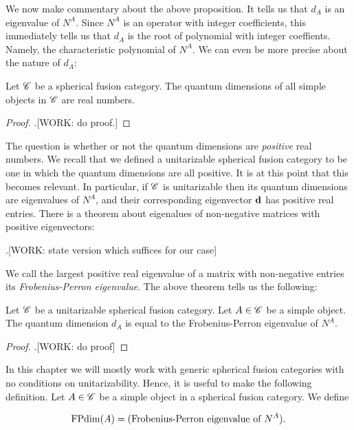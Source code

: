 We now make commentary about the above proposition. It tells us that $d_A$ is an eigenvalue of $N^A$. Since $N^A$ is an operator with integer coefficients, this immediately tells us that $d_A$ is the root of polynomial with integer coeffients. Namely, the characteristic polynomial of $N^A$. We can even be more precise about the nature of $d_A$:

\begin{corollary} Let $\mathscr{C}$ be a spherical fusion category. The quantum dimensions of all simple objects in $\mathscr{C}$ are real numbers.
\end{corollary}
\begin{proof}.[WORK: do proof.]
\end{proof}

The question is whether or not the quantum dimensions are \textit{positive} real numbers. We recall that we defined a unitarizable spherical fusion category to be one in which the quantum dimensions are all positive. It is at this point that this becomes relevant. In particular, if $\mathscr{C}$ is unitarizable then its quantum dimensions are eigenvalues of $N^A$, and their corresponding eigenvector $\bold{d}$ has positive real entries. There is a theorem about eigenalues of non-negative matrices with positive eigenvectors:

\begin{theorem} .[WORK: state version which suffices for our case]
\end{theorem}

We call the largest positive real eigenvalue of a matrix with non-negative entries its \textit{Frobenius-Perron eigenvalue}. The above theorem tells us the following:

\begin{corollary} Let $\mathscr{C}$ be a unitarizable spherical fusion category. Let $A\in \mathscr{C}$ be a simple object. The quantum dimension $d_A$ is equal to the Frobenius-Perron eigenvalue of $N^A$.
\end{corollary}
\begin{proof}.[WORK: do proof]
\end{proof}

In this chapter we will mostly work with generic spherical fusion categories with no conditions on unitarizability. Hence, it is useful to make the following definition. Let $A\in\mathscr{C}$ be a simple object in a spherical fusion category. We define

$$\operatorname{FPdim}(A)=(\text{Frobenius-Perron eigenvalue of $N^A$}).$$

